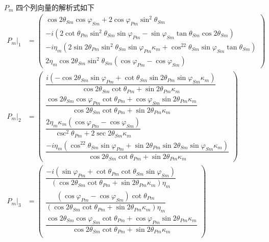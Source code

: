 \(P_m\) 四个列向量的解析式如下
\begin{align*}
	P_m|_1 & =
	\begin{pmatrix}
		\cos2\theta_{Sm} \cos\varphi_{Sm} + 2\cos\varphi_{Pm} \sin^2\theta_{Sm}                                                                      \\
		-i \left( 2\cot\theta_{Pm} \sin^2\theta_{Sm} \sin\varphi_{Pm} - \sin\varphi_{Sm} \tan\theta_{Sm} \cos2\theta_{Sm} \right)                    \\
		-i \eta_m \left( 2\sin2\theta_{Pm} \sin^2\theta_{Sm} \sin\varphi_{Pm} \kappa_m + \cos^22\theta_{Sm} \sin\varphi_{Sm} \tan\theta_{Sm} \right) \\
		2\eta_m \cos2\theta_{Sm} \sin^2\theta_{Sm} \left( \cos\varphi_{Pm} - \cos\varphi_{Sm} \right)
	\end{pmatrix}
	\\[2ex]
	P_m|_2 & =
	\begin{pmatrix}
		\dfrac{i \left( -\cos2\theta_{Sm} \sin\varphi_{Pm} + \cot\theta_{Sm} \sin2\theta_{Pm} \sin\varphi_{Sm} \kappa_m \right)}{\cos2\theta_{Sm} \cot\theta_{Pm} + \sin2\theta_{Pm} \kappa_m} \\
		\dfrac{\cos2\theta_{Sm} \cos\varphi_{Pm} \cot\theta_{Pm} + \cos\varphi_{Sm} \sin2\theta_{Pm} \kappa_m}{\cos2\theta_{Sm} \cot\theta_{Pm} + \sin2\theta_{Pm} \kappa_m}                   \\
		\dfrac{2\eta_m \kappa_m \left( \cos\varphi_{Pm} - \cos\varphi_{Sm} \right)}{\csc^2\theta_{Pm} + 2\sec2\theta_{Sm} \kappa_m}                                                            \\
		\dfrac{-i \eta_m \left( \cos^22\theta_{Sm} \sin\varphi_{Pm} + \sin2\theta_{Pm} \sin2\theta_{Sm} \sin\varphi_{Sm} \kappa_m \right)}{\cos2\theta_{Sm} \cot\theta_{Pm} + \sin2\theta_{Pm} \kappa_m}
	\end{pmatrix}
	\\[2ex]
	P_m|_3 & =
	\begin{pmatrix}
		\dfrac{-i \left( \sin\varphi_{Pm} + \cot\theta_{Pm} \cot\theta_{Sm} \sin\varphi_{Sm} \right)}{\left( \cos2\theta_{Sm} \cot\theta_{Pm} + \sin2\theta_{Pm} \kappa_m \right) \eta_m} \\
		\dfrac{\left( \cos\varphi_{Pm} - \cos\varphi_{Sm} \right) \cot\theta_{Pm}}{\left( \cos2\theta_{Sm} \cot\theta_{Pm} + \sin2\theta_{Pm} \kappa_m \right) \eta_m}                    \\
		\dfrac{\cos2\theta_{Sm} \cos\varphi_{Sm} \cot\theta_{Pm} + \cos\varphi_{Pm} \sin2\theta_{Pm} \kappa_m}{\cos2\theta_{Sm} \cot\theta_{Pm} + \sin2\theta_{Pm} \kappa_m}              \\

\end{pmatrix}
\end{align*}
